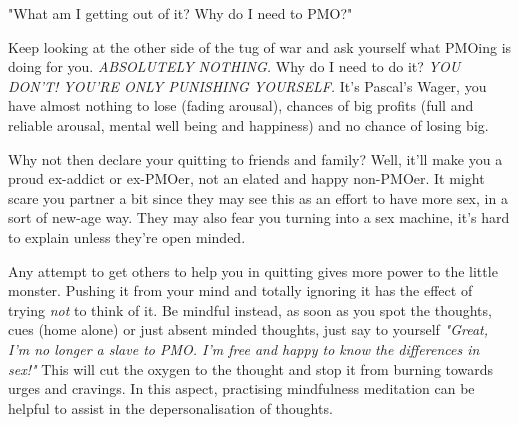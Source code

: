 \documentclass[easypeasy.tex]{subfiles}
\begin{document}
  {\Large "What am I getting out of it? Why do I need to PMO?"}

Keep looking at the other side of the tug of war and ask yourself what PMOing is doing for you. \textit{ABSOLUTELY NOTHING.} Why do I need to do it? \textit{YOU DON'T! YOU'RE ONLY PUNISHING YOURSELF.} It's Pascal's Wager, you have almost nothing to lose (fading arousal), chances of big profits (full and reliable arousal, mental well being and happiness) and no chance of losing big.

Why not then declare your quitting to friends and family? Well, it'll make you a proud ex-addict or ex-PMOer, not an elated and happy non-PMOer. It might scare you partner a bit since they may see this as an effort to have more sex, in a sort of new-age way. They may also fear you turning into a sex machine, it's hard to explain unless they're open minded.

    Any attempt to get others to help you in quitting gives more power to the little monster. Pushing it from your mind and totally ignoring it has the effect of trying \textit{not} to think of it. Be mindful instead, as soon as you spot the thoughts, cues (home alone) or just absent minded thoughts, just say to yourself \textit{"Great, I'm no longer a slave to PMO. I'm free and happy to know the differences in sex!"} This will cut the oxygen to the thought and stop it from burning towards urges and cravings. In this aspect, practising mindfulness meditation can be helpful to assist in the depersonalisation of thoughts.
\end{document}

